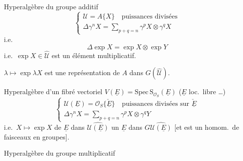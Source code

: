 \documentclass[11pt,a4paper]{article}
\begin{document}

Hyperalgèbre du groupe additif
\[
\left\lbrace
\begin{array}{l}
\mathcal{U} = A\{X\} \quad \text{puissances divisées} \\
\Delta \gamma^n X = \displaystyle\sum_{p+q=n} \gamma^p X \otimes \gamma^q X
\end{array}
\right.
\]
i.e.
\[
\Delta \exp X = \exp X \otimes \exp Y
\]
i.e.\ $\exp X \in \widehat{\mathcal{U}}$ est un élément multiplicatif.

$\lambda \mapsto \exp \lambda X$ est une représentation de $A$ dans
$G(\widehat{\mathcal{U}})$.

Hyperalgèbre d'un  fibré vectoriel
$V(\underline{E}) = \mathrm{Spec}\, \mathrm{S}_{\mathcal{O}_S}(\underline{E})$
($\underline{E}$ loc.\ libre \ldots)
\[
\left\lbrace
\begin{array}{l}
\mathcal{U}(\underline{E}) = \mathcal{O}_S\{\check{\underline{E}}\} \quad
\text{puissances divisées sur } \check{\underline{E}} \\
\Delta \gamma^n X = \displaystyle\sum_{p+q=n} \gamma^p X \otimes \gamma^q Y
\end{array}
\right.
\]
i.e.\ $X \mapsto \exp X$ de $\underline{E}$ dans
$\widehat{\mathcal{U}(\underline{E})}$ \struck{\ill{}}  un
$\underline{E}$ dans $G\widehat{\mathcal{U}(\underline{E})}$ [et est
un homom.\ de faisceaux en groupes].

Hyperalgèbre du groupe multiplicatif

\end{document}
